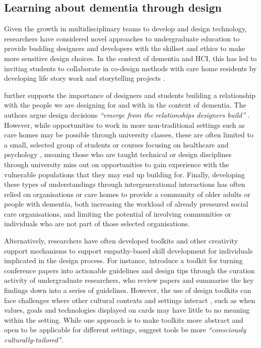 \subsection{Learning about dementia through design}
\label{Dementia-Design}
Given the growth in multidisciplinary teams to develop and design technology, researchers have considered novel approaches to undergraduate education to provide budding designers and developers with the skillset and ethics to make more sensitive design choices. In the context of dementia and HCI, this has led to inviting students to collaborate in co-design methods with care home residents by developing life story work \citep{mckeown2015you} and storytelling projects \citep{hannan_zeitgeist_2019}. 

\cite{hendriks_valuing_2018} further supports the importance of designers and students building a relationship with the people we are designing for and with in the context of dementia. The authors argue design decisions \textit{``emerge from the relationships designers build''} \citep[pg.3]{hendriks_valuing_2018}. However, while opportunities to work in more non-traditional settings such as care homes may be possible through university classes, these are often limited to a small, selected group of students or courses focusing on healthcare and psychology \citep{kinnunen_understanding_2018}, meaning those who are taught technical or design disciplines through university miss out on opportunities to gain experience with the vulnerable populations that they may end up building for. Finally, developing these types of understandings through intergenerational interactions has often relied on organisations or care homes to provide a community of older adults or people with dementia, both increasing the workload of already pressured social care organisations, and limiting the potential of involving communities or individuals who are not part of those selected organisations. 

Alternatively, researchers have often developed toolkits and other creativity support mechanisms to support empathy-based skill development for individuals implicated in the design process. For instance, \cite{chen2020interaction} introduce a toolkit for turning conference papers into actionable guidelines and design tips through the curation activity of undergraduate researchers, who review papers and summarise the key findings down into a series of guidelines. However, the use of design toolkits can face challenges where other cultural contexts and settings interact \citep{peters2020toolkits}, such as when values, goals and technologies displayed on cards may have little to no meaning within the setting. While one approach is to make toolkits more abstract and open to be applicable for different settings, \cite{peters2020toolkits} suggest tools be more \textit{``consciously culturally-tailored''}.  

